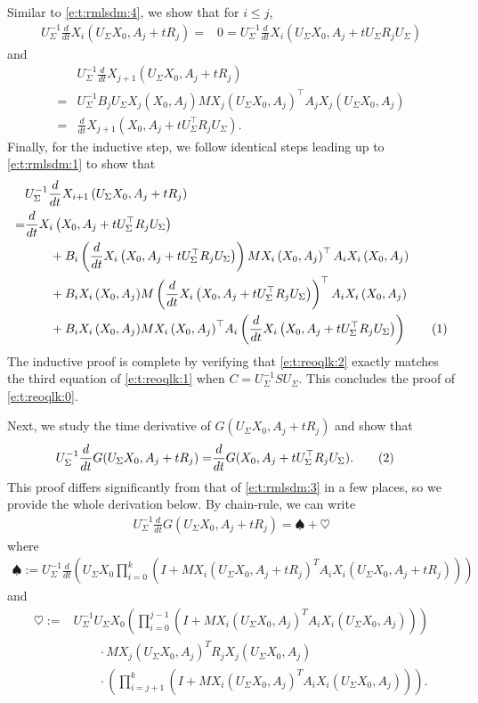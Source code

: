 \documentclass{article}
\newcommand*\lrp[1]{\left( #1 \right)}
\newcommand\numberthis{\addtocounter{equation}{1}\tag{\theequation}}
\newcommand{\US}{U_\Sigma}
\begin{document}
Similar to \eqref{e:t:rmlsdm:4}, we show that for $i\leq j$, 
\begin{align*}
\US^{-1} \frac{d}{dt} X_{i} \lrp{\US X_0, A_j + t R_j} 
=& 0 = \US^{-1} \frac{d}{dt} X_{i} \lrp{\US X_0, A_j + t \US R_j \US}
\end{align*}
and
\begin{align*}
&\US^{-1} \frac{d}{dt} X_{j+1} \lrp{\US X_0, A_j + t R_j} \\
=& \US^{-1} B_j \US X_j( X_0, A_j) M X_j(\US X_0, A_j)^\top A_j X_j(\US X_0, A_j)\\
=& \frac{d}{dt} X_{j+1} \lrp{X_0, A_j + t \US^{\top} R_j \US}.
\end{align*}
Finally, for the inductive step, we follow identical steps leading up to \eqref{e:t:rmlsdm:1} to show that
\begin{align*}
& \US^{-1} \frac{d}{dt} X_{i+1} \lrp{\US X_0, A_j + t R_j}\\
=&\frac{d}{dt} {X_i\lrp{X_0, A_j + t \US^{\top} R_j \US}}\\
&\qquad + B_i \lrp{\frac{d}{dt}X_i\lrp{ X_0, A_j + t \US^{\top} R_j \US}} M X_i\lrp{X_0, A_j}^{\top} A_i X_i\lrp{X_0, A_j}\\
&\qquad + B_i {X_i\lrp{X_0, A_j}} M \lrp{\frac{d}{dt}X_i\lrp{ X_0, A_j + t \US^{\top} R_j \US}}^{\top} A_i X_i\lrp{X_0, A_j}\\
&\qquad + B_i {X_i\lrp{X_0, A_j}} M {X_i\lrp{X_0, A_j}}^{\top} A_i \lrp{\frac{d}{dt}X_i\lrp{ X_0, A_j + t \US^{\top} R_j \US}}
\numberthis \label{e:t:reoqlk:2}
\end{align*}
The inductive proof is complete by verifying that \eqref{e:t:reoqlk:2} exactly matches the third equation of \eqref{e:t:reoqlk:1} when $C = \US^{-1} S \US$. This concludes the proof of \eqref{e:t:reoqlk:0}.

Next, we study the time derivative of $G(\US X_0, A_j + t R_j)$ and show that 
\begin{align*}
\US^{-1} \frac{d}{dt} G(\US X_0, A_j + t R_j)=& \frac{d}{dt} G(X_0, A_j + t \US^{\top} R_j \US).
\numberthis \label{e:t:reoqlk:3}
\end{align*}
This proof differs significantly from that of \eqref{e:t:rmlsdm:3} in a few places, so we provide the whole derivation below.  By chain-rule, we can write
\begin{align*}
\US^{-1} \frac{d}{dt} G(\US X_0, A_j + t R_j) = \spadesuit + \heartsuit
\end{align*}
where
\begin{align*}
\spadesuit := \US^{-1} \frac{d}{dt} \lrp{\US X_0 \prod_{i=0}^{k} \lrp{I + M X_i(\US X_0,A_j+tR_j)^T A_i X_i(\US X_0,A_j+tR_j)}}
\end{align*}
and 
\begin{align*}
\heartsuit :=& \US^{-1} \US X_0 \lrp{ \prod_{i=0}^{j-1} \lrp{I + M X_i(\US X_0,A_j)^T A_i X_i(\US X_0,A_j)}} \\
&\qquad \cdot M X_j(\US X_0,A_j)^T R_j X_j(\US X_0,A_j) \\
&\qquad \cdot \lrp{ \prod_{i=j+1}^{k} \lrp{I + M X_i(\US X_0,A_j)^T A_i X_i(\US X_0,A_j)}}.
\end{align*}
\end{document}
